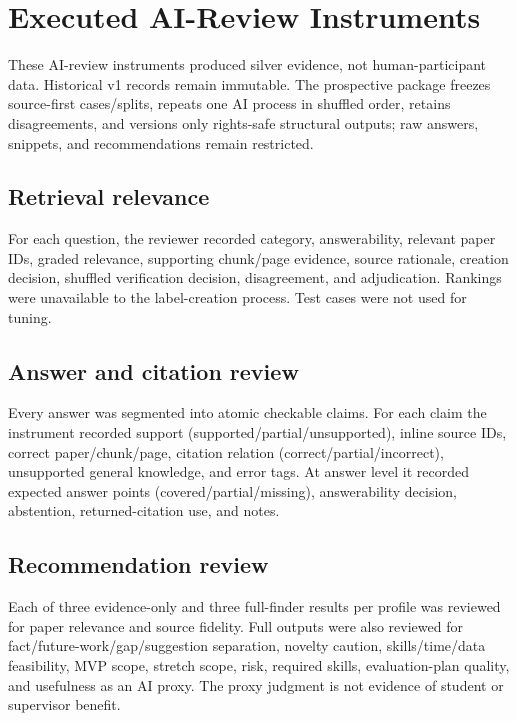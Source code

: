 \chapter{Executed AI-Review Instruments}
\label{app:review-instruments}

These AI-review instruments produced silver evidence, not human-participant data. Historical v1 records remain immutable. The prospective package freezes source-first cases/splits, repeats one AI process in shuffled order, retains disagreements, and versions only rights-safe structural outputs; raw answers, snippets, and recommendations remain restricted.

\section{Retrieval relevance}

For each question, the reviewer recorded category, answerability, relevant paper IDs, graded relevance, supporting chunk/page evidence, source rationale, creation decision, shuffled verification decision, disagreement, and adjudication. Rankings were unavailable to the label-creation process. Test cases were not used for tuning.

\section{Answer and citation review}

Every answer was segmented into atomic checkable claims. For each claim the instrument recorded support (supported/partial/unsupported), inline source IDs, correct paper/chunk/page, citation relation (correct/partial/incorrect), unsupported general knowledge, and error tags. At answer level it recorded expected answer points (covered/partial/missing), answerability decision, abstention, returned-citation use, and notes.

\section{Recommendation review}

Each of three evidence-only and three full-finder results per profile was reviewed for paper relevance and source fidelity. Full outputs were also reviewed for fact/future-work/gap/suggestion separation, novelty caution, skills/time/data feasibility, MVP scope, stretch scope, risk, required skills, evaluation-plan quality, and usefulness as an AI proxy. The proxy judgment is not evidence of student or supervisor benefit.

